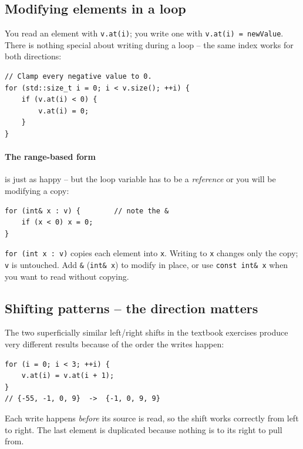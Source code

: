 \documentclass[11pt]{article}
\begin{document}
\subsection{Modifying elements in a loop}

You read an element with \texttt{v.at(i)}; you write one with
\texttt{v.at(i) = newValue}. There is nothing special about writing
during a loop -- the same index works for both directions:

\begin{lstlisting}
// Clamp every negative value to 0.
for (std::size_t i = 0; i < v.size(); ++i) {
    if (v.at(i) < 0) {
        v.at(i) = 0;
    }
}
\end{lstlisting}

\paragraph{The range-based form} is just as happy -- but the loop
variable has to be a \emph{reference} or you will be modifying a copy:

\begin{lstlisting}
for (int& x : v) {        // note the &
    if (x < 0) x = 0;
}
\end{lstlisting}

\begin{warnbox}
\texttt{for (int x : v)} copies each element into \texttt{x}. Writing
to \texttt{x} changes only the copy; \texttt{v} is untouched. Add
\texttt{\&} (\texttt{int\& x}) to modify in place, or use
\texttt{const int\& x} when you want to read without copying.
\end{warnbox}

\subsection{Shifting patterns -- the direction matters}

The two superficially similar left/right shifts in the textbook
exercises produce very different results because of the order the writes
happen:

\begin{examplebox}
\begin{lstlisting}
for (i = 0; i < 3; ++i) {
    v.at(i) = v.at(i + 1);
}
// {-55, -1, 0, 9}  ->  {-1, 0, 9, 9}
\end{lstlisting}
Each write happens \emph{before} its source is read, so the shift
works correctly from left to right. The last element is duplicated
because nothing is to its right to pull from.
\end{examplebox}
\end{document}
